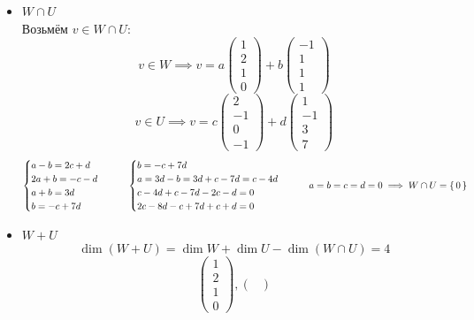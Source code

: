 \begin{itemize}
	\item $ W \cap U $ \\
    Возьмём $ v \in W \cap U $:
    $$ v \in W \implies v = a
    \begin{pmatrix}
    	1 \\
        2 \\
        1 \\
        0
    \end{pmatrix} + b
    \begin{pmatrix}
    	-1 \\
        1 \\
        1 \\
        1
    \end{pmatrix} $$
    $$ v \in U \implies v = c
    \begin{pmatrix}
    	2 \\
        -1 \\
        0 \\
        -1
    \end{pmatrix} + d
    \begin{pmatrix}
    	1 \\
        -1 \\
        3 \\
        7
    \end{pmatrix} $$
    $$
    \begin{cases}
    	a - b = 2c + d \\
        2a + b = -c - d \\
        a + b = 3d \\
        b = -c + 7d
    \end{cases} \qquad
    \begin{cases}
        b = -c + 7d \\
        a = 3d - b = 3d + c - 7d = c - 4d \\
        c - 4d + c - 7d - 2c - d = 0 \\
        2c - 8d - c + 7d + c + d = 0
    \end{cases} \qquad a = b = c = d = 0 \implies W \cap U = \set{0} $$
    \item $ W + U $
    $$ \dim (W + U) = \dim W + \dim U - \dim (W \cap U) = 4 $$
    $$
    \begin{pmatrix}
        1 \\
        2 \\
        1 \\
        0
    \end{pmatrix},
    \begin{pmatrix}

\end{pmatrix}$$
\end{itemize}
